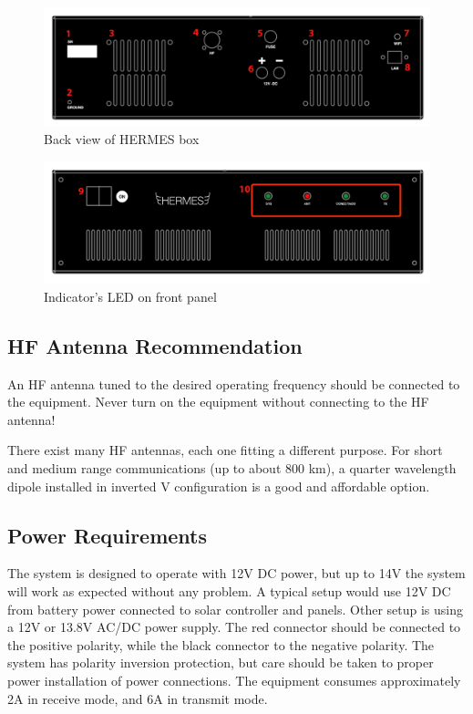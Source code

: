 \documentclass[11pt,a4paper]{article}
\begin{document}
\begin{figure}[!ht]
\includegraphics[width=1\textwidth]{pictures/traseiro.png}
\caption{Back view of HERMES box}
\label{fig:backview}
\end{figure}

\begin{figure}[!ht]
\includegraphics[width=1\textwidth]{pictures/front.png}
\caption{Indicator's LED on front panel}
\label{fig:frontview}
\end{figure}

\subsection{HF Antenna Recommendation}

An HF antenna tuned to the desired operating frequency should be connected to the equipment. Never turn on the equipment without connecting to the HF antenna!

There exist many HF antennas, each one fitting a different purpose. For short and medium range communications (up to about 800 km), a quarter wavelength dipole installed in inverted V configuration is a good and affordable option.

\subsection{Power Requirements}

The system is designed to operate with 12V DC power, but up to 14V the system will work as expected without any problem. A typical setup would use 12V DC from battery power connected to solar controller and panels. Other setup is using a 12V or 13.8V AC/DC power supply. The red connector should be connected to the positive polarity, while the black connector to the negative polarity. The system has polarity inversion protection, but care should be taken to proper power installation of power connections. The equipment consumes approximately 2A in receive mode, and 6A in transmit mode.
\end{document}
